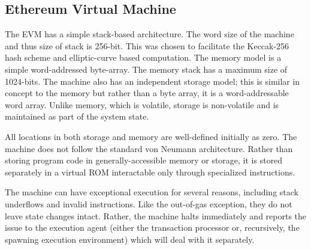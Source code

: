 \documentclass[10pt,a4paper,leqno,bibliography=totoc]{scrartcl}
\newenvironment{alphafootnotes}
{\par\edef\savedfootnotenumber{\number\value{footnote}}
\renewcommand{\thefootnote}{\alph{footnote}}
\setcounter{footnote}{0}}
{\par\setcounter{footnote}{\savedfootnotenumber}}
\begin{document}
\begin{alphafootnotes}
\begin{multicols*}{2}
		\subsection{Ethereum Virtual Machine}
			The EVM has a simple stack-based architecture. The word size of the machine and thus size of stack is 256-bit. This was chosen to facilitate the Keccak-256 hash scheme and elliptic-curve based computation. The memory model is a simple word-addressed byte-array. The memory stack has a maximum size of 1024-bits. The machine also has an independent storage model; this is similar in concept to the memory but rather than a byte array, it is a word-addressable word array. Unlike memory, which is volatile, storage is non-volatile and is maintained as part of the system state. 

			All locations in both storage and memory are well-defined initially as zero. The machine does not follow the standard von Neumann architecture. Rather than storing program code in generally-accessible memory or storage, it is stored separately in a virtual ROM interactable only through specialized instructions. 
			

			The machine can have exceptional execution for several reasons, including stack underflows and invalid instructions. Like the out-of-gas exception, they do not leave state changes intact. Rather, the machine halts immediately and reports the issue to the execution agent (either the transaction processor or, recursively, the spawning execution environment) which will deal with it separately. 
			
			

\end{multicols*}
\end{alphafootnotes}
\end{document}
